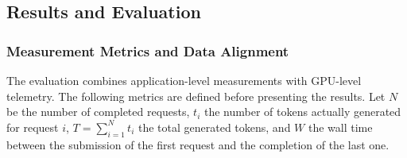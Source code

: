 \subsection{Results and Evaluation}
\label{subsec:multi-ollama-results}

\subsubsection{Measurement Metrics and Data Alignment}

The evaluation combines application-level measurements with GPU-level telemetry. The following metrics are defined before presenting the results. Let $N$ be the number of completed requests, $t_i$ the number of tokens actually generated for request $i$, $T=\sum_{i=1}^{N}t_i$ the total generated tokens, and $W$ the wall time between the submission of the first request and the completion of the last one.

